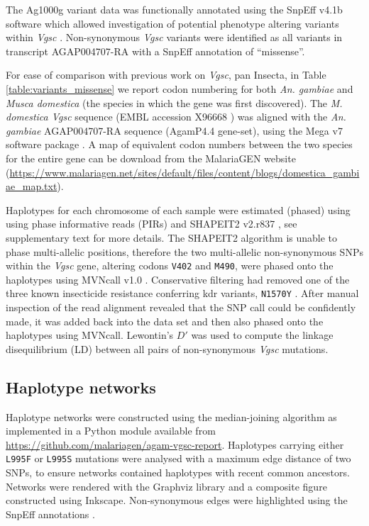 \documentclass[a4paper,11pt,abstracton,hidelinks]{scrartcl}
\begin{document}
%
The Ag1000g variant data was functionally annotated using the SnpEff v4.1b software which allowed investigation of potential phenotype altering variants within \emph{Vgsc} \cite{Cingolani2012}.
%
Non-synonymous \emph{Vgsc} variants were identified as all variants in transcript AGAP004707-RA with a SnpEff annotation of ``missense''.

%
For ease of comparison with previous work on \emph{Vgsc}, pan Insecta, in Table \ref{table:variants_missense} we report codon numbering for both \emph{An. gambiae} and \emph{Musca domestica} (the species in which the gene was first discovered).
%
The \emph{M. domestica Vgsc} sequence (EMBL accession X96668 \cite{Williamson1996}) was aligned with the \emph{An. gambiae} AGAP004707-RA sequence (AgamP4.4 gene-set), using the Mega v7 software package \cite{Kumar2016}.
%
A map of equivalent codon numbers between the two species for the entire gene can be download from the MalariaGEN website (\url{https://www.malariagen.net/sites/default/files/content/blogs/domestica_gambiae_map.txt}).

%
Haplotypes for each chromosome of each sample were estimated (phased) using using phase informative reads (PIRs) and SHAPEIT2 v2.r837 \cite{Delaneau2013}, see \cite{Ag1000gConsortium2017} supplementary text for more details.
%
The SHAPEIT2 algorithm is unable to phase multi-allelic positions, therefore the two multi-allelic non-synonymous SNPs within the \emph{Vgsc} gene, altering codons \texttt{V402} and \texttt{M490}, were phased onto the haplotypes using MVNcall v1.0 \cite{Menelaou2013}.
%
Conservative filtering had removed one of the three known insecticide resistance conferring kdr variants, \texttt{N1570Y} \cite{Jones2012}.
%
After manual inspection of the read alignment revealed that the SNP call could be confidently made, it was added back into the data set and then also phased onto the haplotypes using MVNcall.
%
Lewontin's $D'$ \cite{Lewontin1964} was used to compute the linkage disequilibrium (LD) between all pairs of non-synonymous \emph{Vgsc} mutations.


\subsection*{Haplotype networks}

%
Haplotype networks were constructed using the median-joining algorithm \cite{Bandelt1999} as implemented in a Python module available from \url{https://github.com/malariagen/agam-vgsc-report}.
%
Haplotypes carrying either \texttt{L995F} or \texttt{L995S} mutations were analysed with a maximum edge distance of two SNPs, to ensure networks contained haplotypes with recent common ancestors.
%
Networks were rendered with the Graphviz library and a composite figure constructed using Inkscape.
%
Non-synonymous edges were highlighted using the SnpEff annotations \cite{Cingolani2012}.
\end{document}
